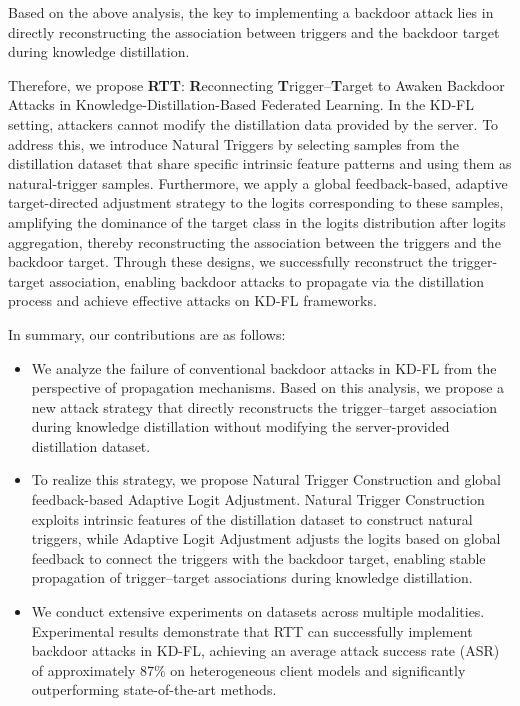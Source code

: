 \documentclass[lettersize,journal]{IEEEtran}
\newif\ifhighlight
\newcommand{\hlone}[1]{%
    \ifhighlight{\color{reviewer1}#1}\else#1\fi
}
\begin{document}
\hlone{Based on the above analysis, the key to implementing a backdoor attack lies in directly reconstructing the association between triggers and the backdoor target during knowledge distillation.}
Therefore, we propose \textbf{RTT}: \textbf{R}econnecting \textbf{T}rigger–\textbf{T}arget to Awaken Backdoor Attacks in Knowledge-Distillation-Based Federated Learning.
In the KD-FL setting, attackers cannot modify the distillation data provided by the server. 
To address this, we introduce Natural Triggers by selecting samples from the distillation dataset that share specific intrinsic feature patterns and using them as natural-trigger samples.
Furthermore, we apply a global feedback-based, adaptive target-directed adjustment strategy to the logits corresponding to these samples, amplifying the dominance of the target class in the logits distribution after logits aggregation, thereby reconstructing the association between the triggers and the backdoor target.
Through these designs, we successfully reconstruct the trigger-target association, enabling backdoor attacks to propagate via the distillation process and achieve effective attacks on KD-FL frameworks.

In summary, our contributions are as follows:

\begin{itemize}

\item We analyze the failure of conventional backdoor attacks in KD-FL from the perspective of propagation mechanisms.
\hlone{Based on this analysis, we propose a new attack strategy that directly reconstructs the trigger–target association during knowledge distillation without modifying the server-provided distillation dataset.}

\item \hlone{To realize this strategy, we propose Natural Trigger Construction and global feedback-based Adaptive Logit Adjustment.
Natural Trigger Construction exploits intrinsic features of the distillation dataset to construct natural triggers, while Adaptive Logit Adjustment adjusts the logits based on global feedback to connect the triggers with the backdoor target, enabling stable propagation of trigger–target associations during knowledge distillation.}


\item We conduct extensive experiments on datasets across multiple modalities.
Experimental results demonstrate that RTT can successfully implement backdoor attacks in KD-FL, achieving an average attack success rate (ASR) of approximately 87\% on heterogeneous client models and significantly outperforming state-of-the-art methods. 

\end{itemize}
\end{document}
